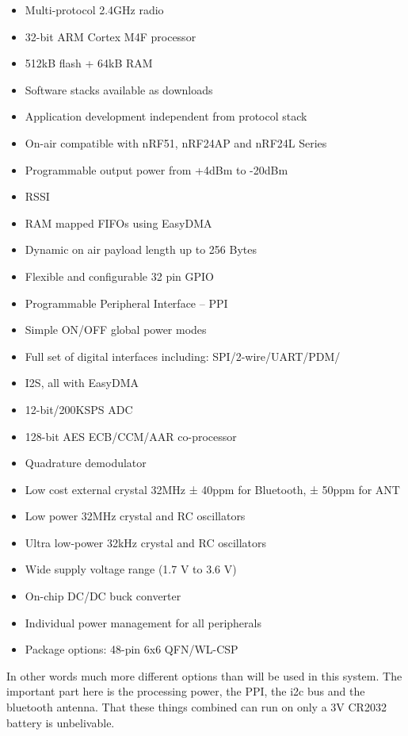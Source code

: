 \begin{itemize}
	\item Multi-protocol 2.4GHz radio
	\item 32-bit ARM Cortex M4F processor
	\item 512kB flash + 64kB RAM
	\item Software stacks available as downloads
	\item Application development independent from protocol stack
	\item On-air compatible with nRF51, nRF24AP and nRF24L Series
	\item Programmable output power from +4dBm to -20dBm
	\item RSSI
	\item RAM mapped FIFOs using EasyDMA
	\item Dynamic on air payload length up to 256 Bytes
	\item Flexible and configurable 32 pin GPIO
	\item Programmable Peripheral Interface – PPI
	\item Simple ON/OFF global power modes
	\item Full set of digital interfaces including: SPI/2-wire/UART/PDM/
	\item I2S, all with EasyDMA
	\item 12-bit/200KSPS ADC
	\item 128-bit AES ECB/CCM/AAR co-processor
	\item Quadrature demodulator
	\item Low cost external crystal 32MHz ± 40ppm for Bluetooth, 	
± 50ppm for ANT
	\item Low power 32MHz crystal and RC oscillators
	\item Ultra low-power 32kHz crystal and RC oscillators
	\item Wide supply voltage range (1.7 V to 3.6 V)
	\item On-chip DC/DC buck converter
	\item Individual power management for all peripherals
	\item Package options: 48-pin 6x6 QFN/WL-CSP
\end{itemize}


In other words much more different options than will be used in this system. The important part here is the processing power, the PPI, the \gls{i2c} bus and the bluetooth antenna. That these things combined can run on only a 3V CR2032 battery is unbelivable. 



